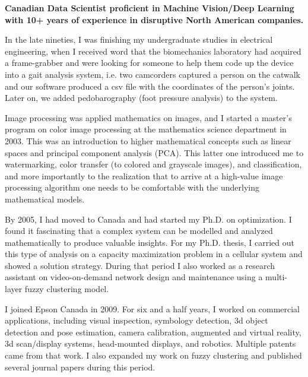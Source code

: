 \onehalfspace
\textbf{\large Canadian Data Scientist proficient in Machine Vision/Deep Learning with 10+ years of experience in 
disruptive North American companies.}
\singlespace

\vspace{1cm}

In the late nineties, I was finishing my undergraduate studies in electrical engineering, when I received word that the biomechanics laboratory had acquired a frame-grabber and were looking for someone to help them code up the device into a gait analysis system, i.e. two camcorders captured a person on the catwalk and our software produced  a csv file with the coordinates of the person's joints. Later on, we added pedobarography (foot pressure analysis) to the system. 

\vspace{0.5cm}
Image processing was applied mathematics on images, and I started a master's program on color image processing at the mathematics  science department in 2003. This was an introduction to higher mathematical concepts such as linear spaces and principal component analysis (PCA). This latter one introduced me to watermarking, color transfer (to colored and grayscale images), and classification, and more importantly to the realization that to arrive at a high-value image processing algorithm one needs to be comfortable with the underlying mathematical models. 

\vspace{0.5cm}
By 2005, I had moved to Canada and had started my Ph.D. on optimization. I found it fascinating that a complex system can be modelled  and analyzed mathematically to produce valuable insights. For my Ph.D. thesis, I carried out this type of analysis on a capacity  maximization problem in a cellular system and showed a solution strategy.  During that period I also worked as a research assistant on video-on-demand network design and maintenance using a multi-layer  fuzzy clustering model.

\vspace{0.5cm}
I joined Epson Canada in 2009. For six and a half years, I worked on commercial applications, including visual inspection, symbology detection, 3d object detection and pose estimation, camera calibration, augmented and virtual reality, 3d scan/display systems, head-mounted displays, and robotics. Multiple patents came from that work. I also expanded my work on fuzzy clustering and published several journal papers during this period.

